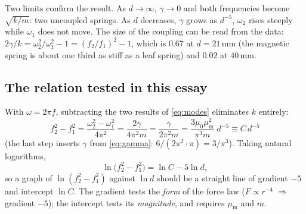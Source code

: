 \documentclass[11pt,a4paper]{article}
\newcommand{\muz}{\mu_0}
\newcommand{\mum}{\mu_{\mathrm m}}
\newcommand{\un}[1]{\,\mathrm{#1}}
\begin{document}
Two limits confirm the result. As $d\to\infty$, $\gamma\to0$ and both frequencies become $\sqrt{k/m}$: two uncoupled springs. As $d$ decreases, $\gamma$ grows as $d^{-5}$, $\omega_2$ rises steeply while $\omega_1$ does not move. The size of the coupling can be read from the data: $2\gamma/k=\omega_2^2/\omega_1^2-1=(f_2/f_1)^2-1$, which is $0.67$ at $d=21\un{mm}$ (the magnetic spring is about one third as stiff as a leaf spring) and $0.02$ at $40\un{mm}$.

\subsection{The relation tested in this essay}\label{sec:main}

With $\omega=2\pi f$, subtracting the two results of \eqref{eq:modes} eliminates $k$ entirely:
\begin{equation}
\boxed{\;f_2^2-f_1^2=\frac{\omega_2^2-\omega_1^2}{4\pi^2}=\frac{2\gamma}{4\pi^2m}=\frac{\gamma}{2\pi^2m}
=\frac{3\muz\mum^2}{\pi^3m}\;d^{-5}\equiv C\,d^{-5}\;}
\label{eq:main}
\end{equation}
(the last step inserts $\gamma$ from \eqref{eq:gamma}: $6/(2\pi^2\cdot\pi)=3/\pi^3$). Taking natural logarithms,
\begin{equation}
\ln\big(f_2^2-f_1^2\big)=\ln C-5\ln d ,
\label{eq:lnln}
\end{equation}
so a graph of $\ln(f_2^2-f_1^2)$ against $\ln d$ should be a straight line of gradient $-5$ and intercept $\ln C$. The gradient tests the \emph{form} of the force law ($F\propto r^{-4}$ $\Rightarrow$ gradient $-5$); the intercept tests its \emph{magnitude}, and requires $\mum$ and $m$.
\end{document}
